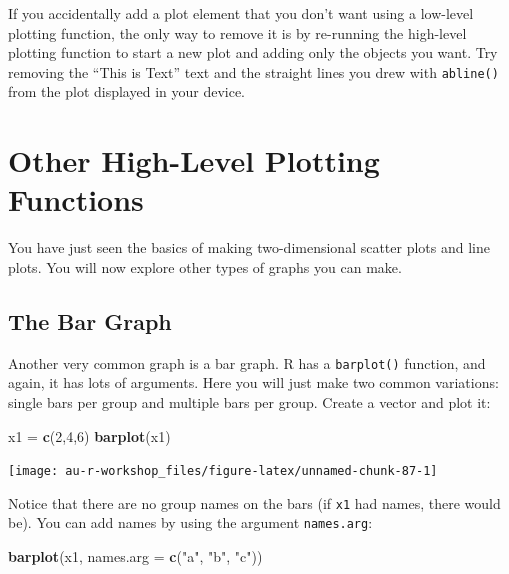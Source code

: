 \documentclass[]{book}
\newenvironment{Shaded}{\begin{snugshade}}{\end{snugshade}}
\newcommand{\DataTypeTok}[1]{\textcolor[rgb]{0.13,0.29,0.53}{#1}}
\newcommand{\DecValTok}[1]{\textcolor[rgb]{0.00,0.00,0.81}{#1}}
\newcommand{\KeywordTok}[1]{\textcolor[rgb]{0.13,0.29,0.53}{\textbf{#1}}}
\newcommand{\NormalTok}[1]{#1}
\newcommand{\StringTok}[1]{\textcolor[rgb]{0.31,0.60,0.02}{#1}}
\begin{document}
If you accidentally add a plot element that you don't want using a low-level plotting function, the only way to remove it is by re-running the high-level plotting function to start a new plot and adding only the objects you want. Try removing the ``This is Text'' text and the straight lines you drew with \texttt{abline()} from the plot displayed in your device.

\hypertarget{other-high-level-plotting-functions}{%
\section{Other High-Level Plotting Functions}\label{other-high-level-plotting-functions}}

You have just seen the basics of making two-dimensional scatter plots and line plots. You will now explore other types of graphs you can make.

\hypertarget{the-bar-graph}{%
\subsection{The Bar Graph}\label{the-bar-graph}}

Another very common graph is a bar graph. R has a \texttt{barplot()} function, and again, it has lots of arguments. Here you will just make two common variations: single bars per group and multiple bars per group. Create a vector and plot it:

\begin{Shaded}
\begin{Highlighting}[]
\NormalTok{x1 =}\StringTok{ }\KeywordTok{c}\NormalTok{(}\DecValTok{2}\NormalTok{,}\DecValTok{4}\NormalTok{,}\DecValTok{6}\NormalTok{)}
\KeywordTok{barplot}\NormalTok{(x1)}
\end{Highlighting}
\end{Shaded}

\begin{center}\texttt{[image: au-r-workshop\_files/figure-latex/unnamed-chunk-87-1]} \end{center}

Notice that there are no group names on the bars (if \texttt{x1} had names, there would be). You can add names by using the argument \texttt{names.arg}:

\begin{Shaded}
\begin{Highlighting}[]
\KeywordTok{barplot}\NormalTok{(x1, }\DataTypeTok{names.arg =} \KeywordTok{c}\NormalTok{(}\StringTok{"a"}\NormalTok{, }\StringTok{"b"}\NormalTok{, }\StringTok{"c"}\NormalTok{))}
\end{Highlighting}
\end{Shaded}
\end{document}
